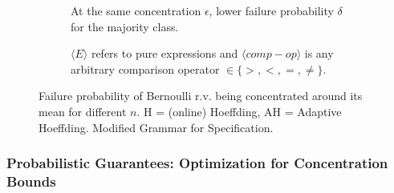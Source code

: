 \begin{figure}[b]
    \centering
    \begin{subfigure}[b]{0.47\linewidth}
        \resizebox{\linewidth}{!}{
            \centering
            
        }
        \caption{At the same concentration $\epsilon$, lower failure probability $\delta$ for the majority class.}
        \label{fig:n-comparison-hoeffding}
    \end{subfigure}
    \hfill
    \begin{subfigure}[b]{0.48\linewidth}
        \centering
           
         \caption{ $\langle E \rangle$ refers to pure expressions and $\langle comp-op \rangle$ is any arbitrary comparison operator $\in \{>, <, =, \neq\}$.}
         \label{fig:grammar}
    \end{subfigure}
    \caption{\figleft{} Failure probability of Bernoulli r.v. being concentrated around its mean for different $n$. H = (online) Hoeffding, AH = Adaptive Hoeffding. \figright{} Modified Grammar for Specification.}
\end{figure}

\subsubsection{Probabilistic Guarantees: Optimization for Concentration Bounds}
\label{sec:contributions:optimization}

